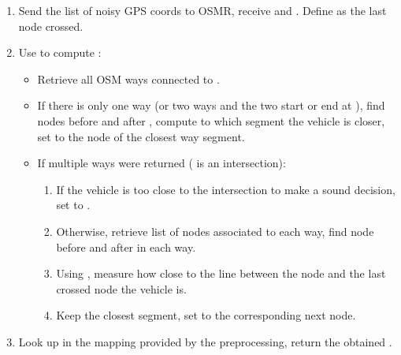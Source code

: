 \documentclass[letterpaper,10pt,english]{sphinxmanual}
\begin{document}
\begin{enumerate}
\def\theenumi{\arabic{enumi}}
\def\labelenumi{\theenumi .}
\makeatletter\def\p@enumii{\p@enumi \theenumi .}\makeatother
\item {} 
Send the list of noisy GPS coords to OSMR, receive  and . Define  as the last node crossed.

\item {} 
Use  to compute :
\begin{itemize}
\item {} 
Retrieve all OSM ways connected to .

\item {} 
If there is only one way (or two ways and the two start or end at ), find nodes before and after , compute to which segment the vehicle is closer, set  to the node of the closest way segment.

\item {} 
If multiple ways were returned ( is an intersection):
\begin{enumerate}
\def\theenumii{\arabic{enumii}}
\def\labelenumii{\theenumii .}
\makeatletter\def\p@enumiii{\p@enumii \theenumii .}\makeatother
\item {} 
If the vehicle is too close to the intersection to make a sound decision, set  to .

\item {} 
Otherwise, retrieve list of nodes associated to each way, find node before and after  in each way.

\item {} 
Using , measure how close to the line between the node and the last crossed node the vehicle is.

\item {} 
Keep the closest segment, set  to the corresponding next node.

\end{enumerate}

\end{itemize}

\item {} 
Look  up in the mapping provided by the preprocessing, return the obtained .

\end{enumerate}
\end{document}
